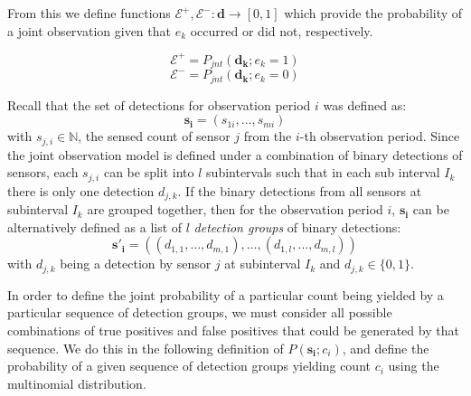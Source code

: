 From this we define functions $\mathcal E^+, \mathcal E^- : \mathbf{d} \rightarrow [0,1]$ which provide the probability of a joint observation given that $e_k$ occurred or did not, respectively. 

\begin{equation}
\mathcal E^+ = P_{jnt}(\mathbf{d_k} ; e_k=1)
\end{equation}
\begin{equation}
\mathcal E^- = P_{jnt}(\mathbf{d_k} ; e_k=0)
\end{equation}



Recall that the set of detections for observation period $i$ was defined as:
\begin{equation*}
    \mathbf{s_i} = (s_{1i}, \ldots, s_{mi})
\end{equation*}
with $s_{j,i} \in \mathbb N$, the sensed count of sensor $j$ from the $i$-th observation period. Since the joint observation model is defined under a combination of binary detections of sensors, each $s_{j,i}$ can be split into $l$ subintervals such that in each sub interval $I_k$ there is only one detection $d_{j,k}$. If the binary detections from all sensors at subinterval $I_k$ are grouped together, then for the observation period $i$, $\mathbf{s_i}$ can be alternatively defined as a list of $l$ \emph{detection groups} of binary detections:
\begin{equation}
    \label{eq:s_i_definition}
    \mathbf{s'_i} = ((d_{1,1}, \ldots, d_{m,1}), \ldots, (d_{1,l}, \ldots, d_{m,l}))
\end{equation}
\noindent with $d_{j,k}$ being a detection by sensor $j$ at subinterval $I_k$ and $d_{j,k} \in \{0, 1\}$. 

In order to define the joint probability of a particular count being yielded by a particular sequence of detection groups, we must consider all possible combinations of true positives and false positives that could be generated by that sequence. We do this in the following definition of $P(\mathbf{s_i} ; c_i)$, and define the probability of a given sequence of detection groups yielding count $c_i$ using the multinomial distribution.

